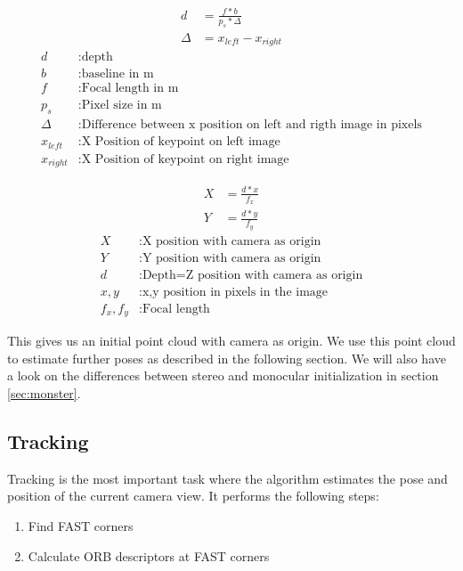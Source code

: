 \documentclass[11pt,a4paper,titlepage,oneside]{report}
\begin{document}
\begin{equation}\label{eq:depth}
\begin{aligned}
	d&=\frac{f*b}{p_s*\Delta}\\
	\Delta&=x_{left}-x_{right}
\end{aligned}
\end{equation}
\begin{align*}
	d &:					\text{depth}\\
	b &:					\text{baseline in m}\\
	f &:					\text{Focal length in m}\\
	p_s	&:				\text{Pixel size in m}\\
	\Delta &:			\text{Difference between x position on left and rigth image in pixels}\\
	x_{left} &:	\text{X Position of keypoint on left image}\\
	x_{right} &: \text{X Position of keypoint on right image}
\end{align*}

\begin{equation}\label{eq:orb_pos}
\begin{aligned}
	X&=\frac{d*x}{f_x}\\
	Y&=\frac{d*y}{f_y}
\end{aligned}
\end{equation}
\begin{align*}
	X &:				\text{X position with camera as origin}\\
	Y &: 				\text{Y position with camera as origin}\\
	d &: 				\text{Depth=Z position with camera as origin}\\
	x,y &:			\text{x,y position in pixels in the image}\\
	f_x,f_y &:	\text{Focal length}
\end{align*}

This gives us an initial point cloud with camera as origin. We use this point cloud to estimate further poses as described in the following section. We will also have a look on the differences between stereo and monocular initialization in section \ref{sec:monster}.

\subsection{Tracking}

Tracking is the most important task where the algorithm estimates the pose and position of the current camera view. It performs the following steps:
\begin{enumerate}
	\item Find FAST corners
	\item Calculate ORB descriptors at FAST corners
\end{enumerate}
\end{document}
